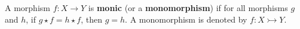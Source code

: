 \begin{definition}
    \label{def:cat:homo}
    A morphism \( f : X \mathop{\to} Y \) is \textbf{monic} (or a \textbf{monomorphism}) if for all morphisms \( g \) and \( h \), if \( g \mathop{\star} f \mathop{=} h \mathop{\star} f \), then \( g \mathop{=} h \). A monomorphism is denoted by \( f : X \rightarrowtail Y \).
\end{definition} 
